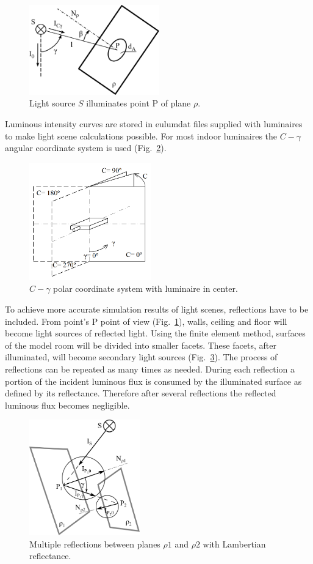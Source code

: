 \begin{figure}[htb]
  \centering
  \includegraphics[width=160pt]{315_osvetlenost_bodovym_zdrojem_2}
  \caption{Light source $S$ illuminates point P of plane $\rho$.}
  \label{fig:osv}
\end{figure}

Luminous intensity curves are stored in eulumdat files supplied with luminaires to make light scene calculations possible. For most indoor luminaires the $C-\gamma$ angular coordinate system is used (Fig.~\ref{fig:cgamma}).

\begin{figure}[htb]
  \centering
  \includegraphics[width=150pt]{Cgama}
  \caption{$C-\gamma$ polar coordinate system with luminaire in center.}
  \label{fig:cgamma}
\end{figure}

To achieve more accurate simulation results of light scenes, reflections have to be included. From point's P point of view (Fig.~\ref{fig:osv}), walls, ceiling and floor will become light sources of reflected light. Using the finite element method, surfaces of the model room will be divided into smaller facets. These facets, after illuminated, will become secondary light sources (Fig.~\ref{fig:difRefl}). The process of reflections can be repeated as many times as needed. During each reflection a portion of the incident luminous flux is consumed by the illuminated surface as defined by its reflectance. Therefore after several reflections the reflected luminous flux becomes negligible.

\begin{figure}[htb]
  \centering
  \includegraphics[width=136pt]{diffuseReflection}
  \caption{Multiple reflections between planes $\rho1$ and $\rho2$ with Lambertian reflectance.}
  \label{fig:difRefl}
\end{figure}

